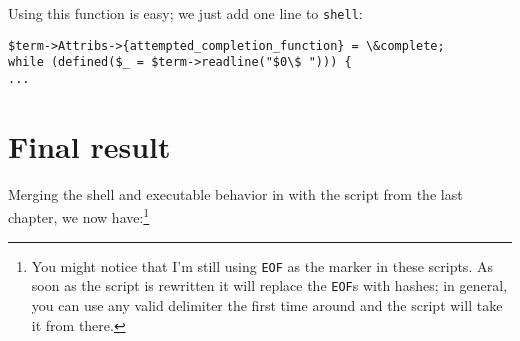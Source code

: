 \documentclass{report}
\begin{document}
    Using this function is easy; we just add one line to {\tt shell}:

\begin{verbatim}
$term->Attribs->{attempted_completion_function} = \&complete;
while (defined($_ = $term->readline("$0\$ "))) {
...
\end{verbatim}

\section{Final result}\label{sec:adding-a-repl-final-result}
    Merging the shell and executable behavior in with the script from the last chapter, we now have:\footnote{You might notice that I'm still using {\tt EOF} as the marker in these scripts. As
    soon as the script is rewritten it will replace the {\tt EOF}s with hashes; in general, you can use any valid delimiter the first time around and the script will take it from there.}
\end{document}
